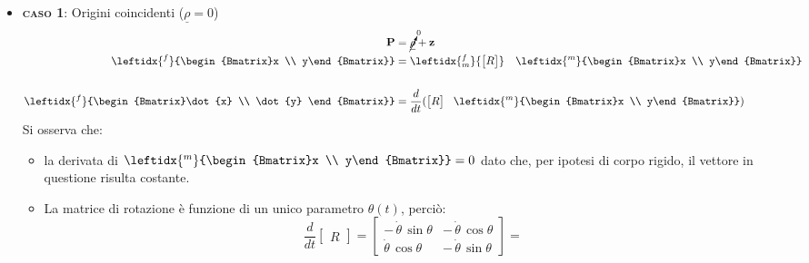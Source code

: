 			\begin{itemize}
				\item {\scshape{\bfseries caso 1}}: Origini coincidenti ($\underline{\rho} = 0$)
					\begin{equation*}
						\begin{split}
							\mathbf{P} &= \cancelto{_0}{\underline{\rho}} + \mathbf{z}\\
							\leftidx{^f}{\begin{Bmatrix}x \\ y\end{Bmatrix}} &= \leftidx{^f_m}{\begin{bmatrix}R\end{bmatrix}}\quad \leftidx{^m}{\begin{Bmatrix}x \\ y\end{Bmatrix}}\\
							\\
							 \leftidx{^f}{\begin{Bmatrix}\dot{x} \\ \dot{y} \end{Bmatrix}} &= \frac{d}{dt}(\begin{bmatrix}R\end{bmatrix} \quad\!\! \leftidx{^m}{\begin{Bmatrix}x \\ y\end{Bmatrix}})
						\end{split}
					\end{equation*}
					Si osserva che:
					\begin{itemize}
						\item la derivata di $ \leftidx{^m}{\begin{Bmatrix}x \\ y\end{Bmatrix}} = 0$ dato che, per ipotesi di corpo rigido, il vettore in questione risulta costante.
						\item La matrice di rotazione è funzione di un unico parametro $\theta(t)$, perciò:
						\begin{equation*}
							\frac{d}{dt}\begin{bmatrix}R\end{bmatrix} = 
								\begin{bmatrix}
									-\, \dot{\theta}\,\sin{\theta} & -\,\dot{\theta}\,\cos{\theta}\\
									\dot{\theta}\, \cos{\theta} & -\,\dot{\theta}\,\sin{\theta}
								\end{bmatrix} = 

\end{equation*}
\end{itemize}
\end{itemize}
